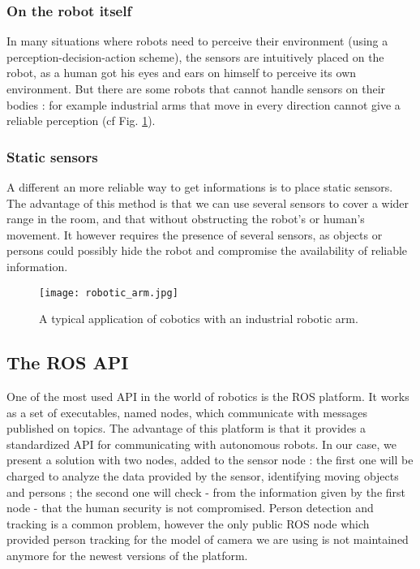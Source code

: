 \documentclass[smallextended]{svjour3}
\begin{document}
\subsubsection{On the robot itself}

In many situations where robots need to perceive their environment (using a perception-decision-action scheme), the sensors are intuitively placed on the robot, as a human got his eyes and ears on himself to perceive its own environment. But there are some robots that cannot handle sensors on their bodies : for example industrial arms that move in every direction cannot give a reliable perception (cf Fig. \ref{fig:robotic_arm}).

\subsubsection{Static sensors}

A different an more reliable way to get informations is to place static sensors. The advantage of this method is that we can use several sensors to cover a wider range in the room, and that without obstructing the robot's or human's movement. It however requires the presence of several sensors, as objects or persons could possibly hide the robot and compromise the availability of reliable information.


\begin{figure}
\centering
\texttt{[image: robotic\_arm.jpg]}
\caption{\label{fig:robotic_arm}A typical application of cobotics with an industrial robotic arm.}
\end{figure}

\subsection{The ROS API}

One of the most used API in the world of robotics is the ROS platform. It works as a set of executables, named nodes, which communicate with messages published on topics. The advantage of this platform is that it provides a standardized API for communicating with autonomous robots. In our case, we present a solution with two nodes, added to the sensor node : the first one will be charged to analyze the data provided by the sensor, identifying moving objects and persons ; the second one will check - from the information given by the first node - that the human security is not compromised.
Person detection and tracking is a common problem, however the only public ROS node which provided person tracking for the model of camera we are using is not maintained anymore for the newest versions of the platform.
\end{document}
